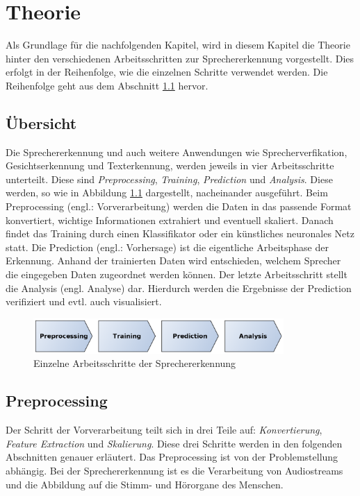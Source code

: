 \chapter{Theorie}
\label{cha:theorie}
Als Grundlage für die nachfolgenden Kapitel, wird in diesem Kapitel die Theorie hinter den verschiedenen Arbeitsschritten zur Sprechererkennung vorgestellt. Dies erfolgt in der Reihenfolge, wie die einzelnen Schritte verwendet werden. Die Reihenfolge geht aus dem Abschnitt \ref{sec:uebersicht} hervor.

\section{Übersicht}
\label{sec:uebersicht}
Die Sprechererkennung und auch weitere Anwendungen wie Sprecherverfikation, Gesichtserkennung und Texterkennung, werden jeweils in vier Arbeitsschritte unterteilt. Diese sind \emph{Preprocessing}, \emph{Training}, \emph{Prediction} und \emph{Analysis}. Diese werden, so wie in Abbildung \ref{fig:allgemeinerAblauf} dargestellt, nacheinander ausgeführt. Beim Preprocessing (engl.: Vorverarbeitung) werden die Daten in das passende Format konvertiert, wichtige Informationen extrahiert und eventuell skaliert. Danach findet das Training durch einen Klassifikator oder ein künstliches neuronales Netz statt. Die Prediction (engl.: Vorhersage) ist die eigentliche Arbeitsphase der Erkennung. Anhand der trainierten Daten wird entschieden, welchem Sprecher die eingegeben Daten zugeordnet werden können. Der letzte Arbeitsschritt stellt die Analysis (engl. Analyse) dar. Hierdurch werden die Ergebnisse der Prediction verifiziert und evtl. auch visualisiert.

\begin{figure}[h]
  \centering
  \includegraphics[width=0.85\textwidth]{images/allgemeinerAblauf}
  \caption{Einzelne Arbeitsschritte der Sprechererkennung}
  \label{fig:allgemeinerAblauf}
\end{figure}

\section{Preprocessing}
Der Schritt der Vorverarbeitung teilt sich in drei Teile auf: \emph{Konvertierung}, \emph{Feature Extraction} und \emph{Skalierung}. Diese drei Schritte werden in den folgenden Abschnitten genauer erläutert. Das Preprocessing ist von der Problemstellung abhängig. Bei der Sprechererkennung ist es die Verarbeitung von Audiostreams und die Abbildung auf die Stimm- und Hörorgane des Menschen.

